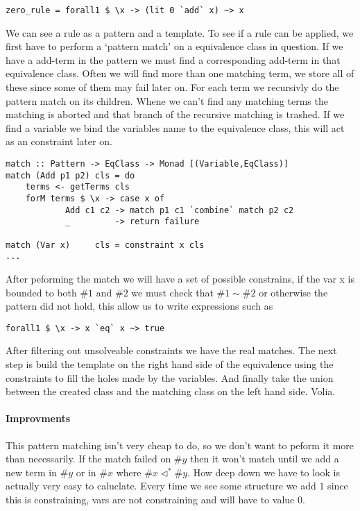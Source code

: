 \begin{verbatim}
zero_rule = forall1 $ \x -> (lit 0 `add` x) ~> x
\end{verbatim}

We can see a rule as a pattern and a template. To see if a rule can be applied, we first have to perform a `pattern match' on a equivalence class in question. If we have a add-term in the pattern we must find a corresponding add-term in that equivalence class. Often we will find more than one matching term, we store all of these since some of them may fail later on. For each term we recursivly do the pattern match on its children. Whene we can't find any matching terms the matching is aborted and that branch of the recursive matching is trashed. If we find a variable we bind the variables name to the equivalence class, this will act as an constraint later on.

\begin{verbatim}
match :: Pattern -> EqClass -> Monad [(Variable,EqClass)]
match (Add p1 p2) cls = do 
    terms <- getTerms cls
    forM terms $ \x -> case x of
            Add c1 c2 -> match p1 c1 `combine` match p2 c2
            _         -> return failure
                                       
match (Var x)     cls = constraint x cls
...
\end{verbatim}

After peforming the match we will have a set of possible constrains, if the var x is bounded to both $\#1$ and $\#2$ we must check that $\#1 \sim \#2$ or otherwise the pattern did not hold, this allow us to write expressions such as

\begin{verbatim}
forall1 $ \x -> x `eq` x ~> true
\end{verbatim}

After filtering out unsolveable constraints we have the real matches. The next step is build the template on the right hand side of the equivalence using the constraints to fill the holes made by the variables. And finally take the union between the created class and the matching class on the left hand side. Volia.

\paragraph{Improvments} This pattern matching isn't very cheap to do, so we don't want to peform it more than necessarily. If the match failed on $\#y$ then it won't match until we add a new term in $\#y$ or in $\#x$ where $\#x \lhd^* \#y$. How deep down we have to look is actually very easy to caluclate. Every time we see some structure we add $1$ since this is constraining, vars are not constraining and will have to value 0. 


